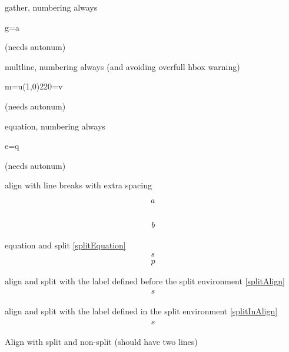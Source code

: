 \documentclass{article}
\def\ifautonum#1{#1}%
\def\ifautonum#1{}%
\begin{document}
\begin{itemize}
{			\item gather, numbering always \begin{gather+} g=a \end{gather+} (needs autonum)
			\item multline, numbering always (and avoiding overfull hbox warning) \begin{multline+} m=u\line(1,0){220}=v \end{multline+} (needs autonum)
			\item equation, numbering always \begin{equation+} e=q \end{equation+} (needs autonum)
		}
		\item align with line breaks with extra spacing
			\begin{align}
				a
				\\[\baselineskip]
				b
			\end{align}
		\ifautonum{
			\item shortcut and split \ref{split} \[ \label{split}\begin{split} s \\ p \end{split} \] (needs autonum)
		}
		\item equation and split \ref{splitEquation} \begin{equation} \label{splitEquation}\begin{split} s \\ p \end{split} \end{equation}
		\item align and split with the label defined before the split environment \ref{splitAlign}
			\begin{align}
				\label{splitAlign}
				\begin{split}
					s
				\end{split}
			\end{align}
			\makeatletter
			\makeatother
		\item align and split with the label defined in the split environment \ref{splitInAlign}
			\begin{align}
				\begin{split}
					s\label{splitInAlign}
				\end{split}
			\end{align}
		\item Align with split and non-split (should have two lines)
			\begin{align}

\end{align}
\end{itemize}
\end{document}
